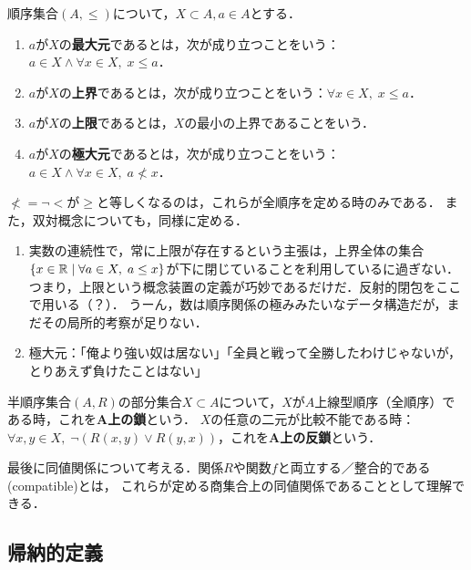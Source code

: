 \documentclass[uplatex, 12pt, dvipdfmx]{jsreport}
\begin{document}
\begin{definition}
    順序集合$(A,\le)$について，$X\subset A, a\in A$とする．
    \begin{enumerate}
        \item $a$が$X$の\textbf{最大元}であるとは，次が成り立つことをいう：$a\in X\land \forall x\in X,\; x\le a$．
        \item $a$が$X$の\textbf{上界}であるとは，次が成り立つことをいう：$\forall x\in X,\; x\le a$．
        \item $a$が$X$の\textbf{上限}であるとは，$X$の最小の上界であることをいう．
        \item $a$が$X$の\textbf{極大元}であるとは，次が成り立つことをいう：$a\in X\land\forall x\in X,\; a\nless x$．
    \end{enumerate}
    $\nless = \lnot<$が$\ge$と等しくなるのは，これらが全順序を定める時のみである．
    また，双対概念についても，同様に定める．
\end{definition}
\begin{remark}\mbox{}
    \begin{enumerate}
        \item 実数の連続性で，常に上限が存在するという主張は，上界全体の集合$\{ x\in\mathbb{R} \mid \forall a\in X,\; a\le x \}$が下に閉じていることを利用しているに過ぎない．
        つまり，上限という概念装置の定義が巧妙であるだけだ．反射的閉包をここで用いる（？）．
        うーん，数は順序関係の極みみたいなデータ構造だが，まだその局所的考察が足りない．
        \item 極大元：「俺より強い奴は居ない」「全員と戦って全勝したわけじゃないが，とりあえず負けたことはない」
    \end{enumerate}
\end{remark}

\begin{definition}
    半順序集合$(A,R)$の部分集合$X\subset A$について，$X$が$A$上線型順序（全順序）である時，これを\textbf{A上の鎖}という．
    $X$の任意の二元が比較不能である時：$\forall x,y\in X,\; \lnot(R(x,y)\lor R(y,x))$，これを\textbf{A上の反鎖}という．
\end{definition}

最後に同値関係について考える．関係$R$や関数$f$と両立する／整合的である(compatible)とは，
これらが定める商集合上の同値関係であることとして理解できる．

\subsection{帰納的定義}
\end{document}
